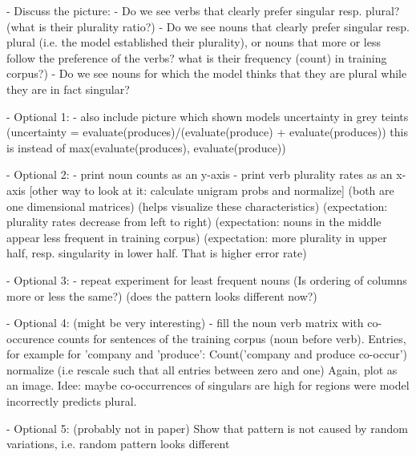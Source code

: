 \begin{multicols}{2}
- Discuss the picture:
  - Do we see verbs that clearly prefer singular resp. plural?
      (what is their plurality ratio?)
  - Do we see nouns that clearly prefer singular resp. plural
      (i.e. the model established their plurality), 
    or nouns that more or less follow the preference of the verbs?
     what is their frequency (count) in training corpus?)
  - Do we see nouns for which the model thinks
    that they are plural while they are in fact singular?
    
- Optional 1:
  - also include picture which shown models uncertainty in grey teints
    (uncertainty = evaluate(produces)/(evaluate(produce) + evaluate(produces))
    this is instead of max(evaluate(produces), evaluate(produce))

- Optional 2:
  - print noun counts as an y-axis
  - print verb plurality rates as an x-axis
  [other way to look at it: calculate unigram probs and normalize]
  (both are one dimensional matrices)
  (helps visualize these characteristics)
  (expectation: plurality rates decrease from left to right)
  (expectation: nouns in the middle appear less frequent in training corpus)
  (expectation: more plurality in upper half, resp. singularity in lower half. That is higher error rate)

- Optional 3:
  - repeat experiment for least frequent nouns
  (Is ordering of columns more or less the same?)
  (does the pattern looks different now?)
  
- Optional 4:
(might be very interesting)
- fill the noun verb matrix with co-occurence counts for
sentences of the training corpus (noun before verb).
Entries, for example for 'company and 'produce':
Count('company and produce co-occur')
normalize (i.e rescale such that all entries between zero and one)
Again, plot as an image.
Idee: maybe co-occurrences of singulars are high for regions
were model incorrectly predicts plural.
  
- Optional 5:
(probably not in paper)
Show that pattern is not caused by random variations,
i.e. random pattern looks different






\end{multicols}
